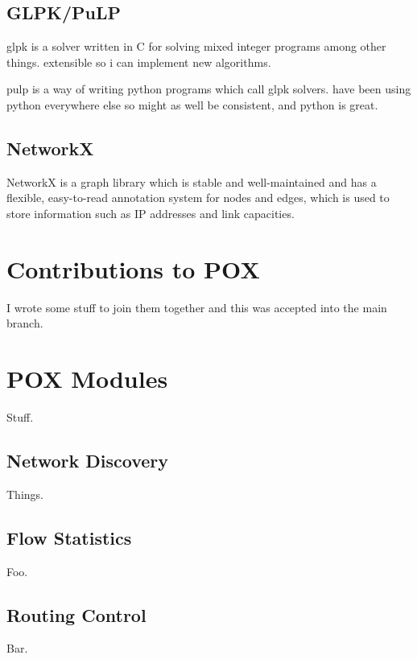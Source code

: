 \subsection{GLPK/PuLP}
glpk is a solver written in C for solving mixed integer programs among other things. extensible so i can implement new algorithms.

pulp is a way of writing python programs which call glpk solvers. have been using python everywhere else so might as well be consistent, and python is great.

\subsection{NetworkX}
NetworkX is a graph library which is stable and well-maintained and has a flexible, easy-to-read annotation system for nodes and edges, which is used to store information such as IP addresses and link capacities.

\section{Contributions to POX}
I wrote some stuff to join them together and this was accepted into the main branch.

\section{POX Modules}
Stuff.

\subsection{Network Discovery}
Things.

\subsection{Flow Statistics}
Foo.

\subsection{Routing Control}
Bar.
